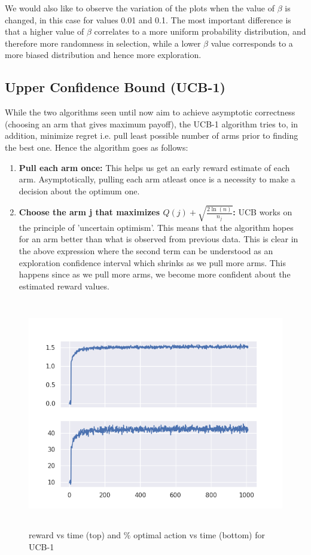 \documentclass[12pt]{extarticle}
\begin{document}
We would also like to observe the variation of the plots when the value of $\beta$ is changed, in this case for values 0.01 and 0.1. The most important difference is that a higher value of $\beta$ correlates to a more uniform probability distribution, and therefore more randomness in selection, while a lower $\beta$ value corresponds to a more biased distribution and hence more exploration.

\subsection{Upper Confidence Bound (UCB-1)}

While the two algorithms seen until now aim to achieve asymptotic correctness (choosing an arm that gives maximum payoff), the UCB-1 algorithm tries to, in addition, minimize regret i.e. pull least possible number of arms prior to finding the best one. Hence the algorithm goes as follows:

\begin{enumerate}
	\item \textbf{Pull each arm once:} This helps us get an early reward estimate of each arm. Asymptotically, pulling each arm atleast once is a necessity to make a decision about the optimum one.
	\item \textbf{Choose the arm j that maximizes $Q(j) + \sqrt{\frac{2\ln(n)}{n_j}}$:} UCB works on the principle of 'uncertain optimism'. This means that the algorithm hopes for an arm better than what is observed from previous data. This is clear in the above expression where the second term can be understood as an exploration confidence interval which shrinks as we pull more arms. This happens since as we pull more arms, we become more confident about the estimated reward values.
\end{enumerate}

\begin{figure}[H]
	\includegraphics[width=\textwidth, height=10cm]{ucb-1.png}
	\caption{reward vs time (top) and $\%$ optimal action vs time (bottom) for UCB-1}
	\label{fig:ucb-1}
\end{figure}
\end{document}
